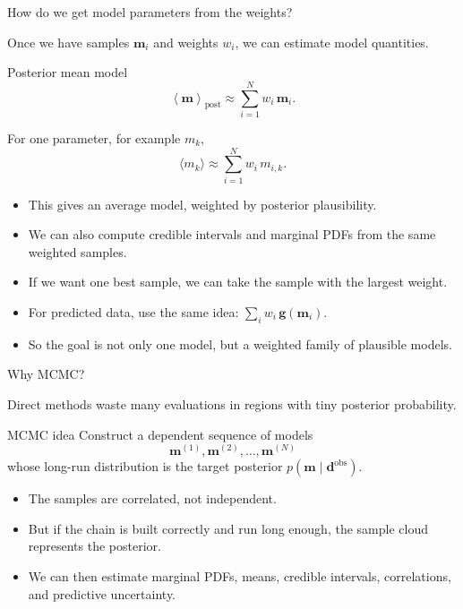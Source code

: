 \documentclass[aspectratio=169]{beamer}
\renewcommand{\vec}[1]{\mathbf{#1}}
\newcommand{\dobs}{{\vec{d}^{\text{obs}}}}
\newcommand{\mm}{ {\vec{m}} }
\newcommand{\mmean}{\left\langle \mm \right\rangle}
\renewcommand{\gg}[1]{\vec{g}\left(#1\right)}
\begin{document}
\begin{frame}{How do we get model parameters from the weights?}
\small

Once we have samples $\mm_i$ and weights $w_i$, we can estimate model quantities.

\begin{block}{Posterior mean model}
\[
\mmean_{\mathrm{post}}
\approx
\sum_{i=1}^{N} w_i\,\mm_i.
\]
\end{block}

For one parameter, for example $m_k$,
\[
\langle m_k\rangle
\approx
\sum_{i=1}^{N} w_i\,m_{i,k}.
\]

\begin{itemize}
    \item[--] This gives an average model, weighted by posterior plausibility.
    \item[--] We can also compute credible intervals and marginal PDFs from the same weighted samples.
    \item[--] If we want one best sample, we can take the sample with the largest weight.
    \item[--] For predicted data, use the same idea: $\sum_i w_i\,\gg{\mm_i}$.
    \item[--] So the goal is not only one model, but a weighted family of plausible models.
\end{itemize}
\end{frame}

\begin{frame}{Why MCMC?}
\small

Direct methods waste many evaluations in regions with tiny posterior probability.

\begin{alertblock}{MCMC idea}
Construct a dependent sequence of models
\[
\mm^{(1)},\mm^{(2)},\dots,\mm^{(N)}
\]
whose long-run distribution is the target posterior $p(\mm\mid\dobs)$.
\end{alertblock}

\begin{itemize}
    \item[--] The samples are correlated, not independent.
    \item[--] But if the chain is built correctly and run long enough, the sample cloud represents the posterior.
    \item[--] We can then estimate marginal PDFs, means, credible intervals, correlations, and predictive uncertainty.
\end{itemize}
\end{frame}
\end{document}
